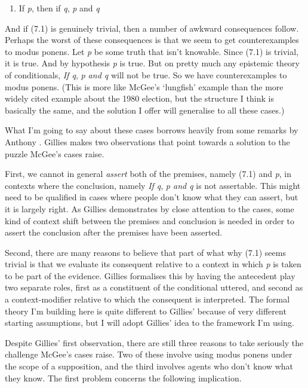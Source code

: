 \renewcommand{\labelenumi}{(7.\arabic{enumi})}
\begin{enumerate}
\setcounter{enumi}{0}
\item If \textit{p}, then if \textit{q}, \textit{p} and \textit{q}
\end{enumerate}

\noindent And if (7.1) is genuinely trivial, then a number of awkward consequences follow. Perhaps the worst of these consequences is that we seem to get counterexamples to modus ponens. Let \textit{p} be some truth that isn't knowable. Since (7.1) is trivial, it is true. And by hypothesis \textit{p} is true. But on pretty much any epistemic theory of conditionals, \textit{If q}, \textit{p and q} will not be true. So we have counterexamples to modus ponens. (This is more like McGee's `lungfish' example than the more widely cited example about the 1980 election, but the structure I think is basically the same, and the solution I offer will generalise to all these cases.)

What I'm going to say about these cases borrows heavily from some remarks by Anthony \citet{Gillies2009-GILOTF}. Gillies makes two observations that point towards a solution to the puzzle McGee's cases raise. 

First, we cannot in general \textit{assert} both of the premises, namely (7.1) and \textit{p}, in contexts where the conclusion, namely \textit{If q}, \textit{p and q} is not assertable. This might need to be qualified in cases where people don't know what they can assert, but it is largely right. As Gillies demonstrates by close attention to the cases, some kind of context shift between the premises and conclusion is needed in order to assert the conclusion after the premises have been asserted.

Second, there are many reasons to believe that part of what why (7.1) seems trivial is that we evaluate its consequent relative to a context in which \textit{p} is taken to be part of the evidence. Gillies formalises this by having the antecedent play two separate roles, first as a constituent of the conditional uttered, and second as a context-modifier relative to which the consequent is interpreted. The formal theory I'm building here is quite different to Gillies' because of very different starting assumptions, but I will adopt Gillies' idea to the framework I'm using.

Despite Gillies' first observation, there are still three reasons to take seriously the challenge McGee's cases raise. Two of these involve using modus ponens under the scope of a supposition, and the third involves agents who don't know what they know. The first problem concerns the following implication.

